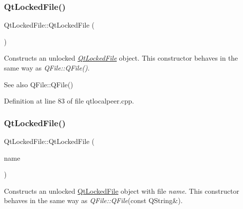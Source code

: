 \subsubsection{\texorpdfstring{Qt\+Locked\+File()}{QtLockedFile()}\hspace{0.1cm}{\footnotesize\ttfamily [1/2]}}
{\footnotesize\ttfamily Qt\+Locked\+File\+::\+Qt\+Locked\+File (\begin{DoxyParamCaption}{ }\end{DoxyParamCaption})}

Constructs an unlocked {\itshape \hyperlink{class_qt_l_p___private_1_1_qt_l_p___private_1_1_qt_locked_file}{Qt\+Locked\+File}} object. This constructor behaves in the same way as {\itshape Q\+File\+::\+Q\+File()}.

\begin{DoxySeeAlso}{See also}
Q\+File\+::\+Q\+File() 
\end{DoxySeeAlso}


Definition at line 83 of file qtlocalpeer.\+cpp.

\mbox{\label{class_qt_l_p___private_1_1_qt_l_p___private_1_1_qt_locked_file_a8b7a228ae02dca4bb99743219d0cdb7b}} 
\subsubsection{\texorpdfstring{Qt\+Locked\+File()}{QtLockedFile()}\hspace{0.1cm}{\footnotesize\ttfamily [2/2]}}
{\footnotesize\ttfamily Qt\+Locked\+File\+::\+Qt\+Locked\+File (\begin{DoxyParamCaption}\item[{const Q\+String \&}]{name }\end{DoxyParamCaption})}

Constructs an unlocked \hyperlink{class_qt_l_p___private_1_1_qt_l_p___private_1_1_qt_locked_file}{Qt\+Locked\+File} object with file {\itshape name}. This constructor behaves in the same way as {\itshape Q\+File\+::\+Q\+File}(const Q\+String\&).

